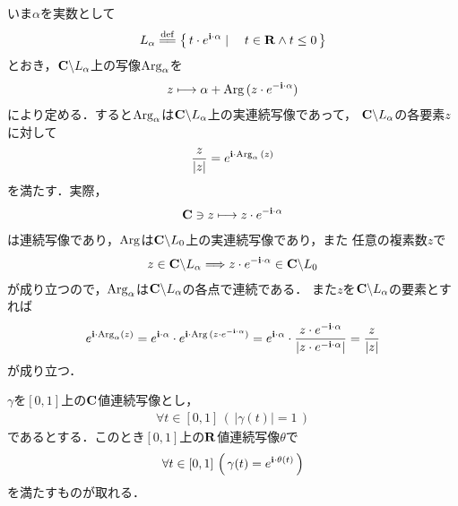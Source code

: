 	いま$\alpha$を実数として
	\begin{align}
		L_{\alpha} \defeq \Set{t \cdot e^{\isym\cdot\alpha}}{t \in \R \wedge t \leq 0}
	\end{align}
	とおき，$\mathbf{C} \backslash L_{\alpha}$上の写像$\operatorname{Arg}_{\alpha}$を
	\begin{align}
		z \longmapsto \alpha + \operatorname{Arg}{(z \cdot e^{-\mathbf{i}\cdot\alpha})}
	\end{align}
	により定める．すると$\operatorname{Arg}_{\alpha}$は$\mathbf{C} \backslash L_{\alpha}$上の実連続写像であって，
	$\mathbf{C} \backslash L_{\alpha}$の各要素$z$に対して
	\begin{align}
		\frac{z}{|z|} = e^{\mathbf{i} \cdot \operatorname{Arg}_{\alpha}{(z)}}
	\end{align}
	を満たす．実際，
	\begin{align}
		\mathbf{C} \ni z \longmapsto z \cdot e^{-\mathbf{i} \cdot \alpha}
	\end{align}
	は連続写像であり，$\operatorname{Arg}$は$\mathbf{C} \backslash L_{0}$上の実連続写像であり，また
	任意の複素数$z$で
	\begin{align}
		z \in \mathbf{C} \backslash L_{\alpha} \Longrightarrow z \cdot e^{-\mathbf{i} \cdot \alpha} \in \mathbf{C} \backslash L_{0}
	\end{align}
	が成り立つので，$\operatorname{Arg}_{\alpha}$は$\mathbf{C} \backslash L_{\alpha}$の各点で連続である．
	また$z$を$\mathbf{C} \backslash L_{\alpha}$の要素とすれば
	\begin{align}
		e^{\mathbf{i} \cdot \operatorname{Arg}_{\alpha}(z)}
		= e^{\mathbf{i} \cdot \alpha} \cdot e^{\mathbf{i} \cdot \operatorname{Arg}{(z \cdot e^{-\mathbf{i}\cdot\alpha})}}
		= e^{\mathbf{i} \cdot \alpha} \cdot \frac{z \cdot e^{-\mathbf{i}\cdot\alpha}}{\left|z \cdot e^{-\mathbf{i}\cdot\alpha}\right|}
		= \frac{z}{|z|}
	\end{align}
	が成り立つ．
	
	\begin{screen}
		\begin{thm}[曲線の偏角の連続選択]\label{thm:continuous_choice_of_arguments}
			$\gamma$を$[0,1]$上の$\mathbf{C}$値連続写像とし，
			\begin{align}
				\forall t \in [0,1]\, (\, |\gamma(t)| = 1\, )
			\end{align}
			であるとする．このとき$[0,1]$上の$\mathbf{R}$値連続写像$\theta$で
			\begin{align}
				\forall t \in [0,1]\, \left(\, \gamma(t) = e^{\mathbf{i}\cdot\theta(t)}\, \right)
			\end{align}
			を満たすものが取れる．
		\end{thm}
	\end{screen}
	
